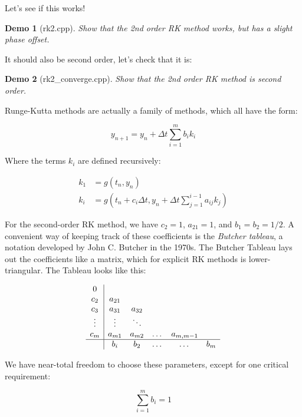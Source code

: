\documentclass{article}
\theoremstyle{demo}
\newtheorem{demo}{Demo}[section]
\begin{document}
Let's see if this works!
\begin{demo}[rk2.cpp]
    Show that the 2nd order RK method works, but has a slight phase offset.
\end{demo}

It should also be second order, let's check that it is:
\begin{demo}[rk2\_converge.cpp]
    Show that the 2nd order RK method is second order.
\end{demo}

Runge-Kutta methods are actually a family of methods, which all have the form:

\begin{equation}
    y_{n+1} = y_n + \Delta t\sum_{i=1}^m b_i k_i
\end{equation}

Where the terms $k_i$ are defined recursively:

\begin{equation}
    \begin{aligned}
        k_1 &= g(t_n, y_n) \\
        k_i &= g(t_n + c_i\Delta t, y_n + \Delta t\sum_{j=1}^{i-1}a_{ij}k_j)
    \end{aligned}
\end{equation}

For the second-order RK method, we have $c_2=1$, $a_{21}=1$, and $b_1=b_2=1/2$.
A convenient way of keeping track of these coefficients is the \textit{Butcher
tableau}, a notation developed by John C. Butcher in the 1970s.  The Butcher
Tableau lays out the coefficients like a matrix, which for explicit RK methods
is lower-triangular.  The Tableau looks like this:

\[
\begin{array}{c|ccccc}
    0\\
    c_2 & a_{21} \\
    c_3 & a_{31} & a_{32} \\
    \vdots & \vdots & \ddots \\
    c_m & a_{m1} & a_{m2} & \dots & a_{m,m-1} \\
    \hline
    & b_i & b_2 & \dots &  \dots & b_m \\
\end{array}
\]

We have near-total freedom to choose these parameters, except for one critical
requirement:

\begin{equation}
    \sum_{i=1}^m b_i = 1
\end{equation} 
\end{document}
